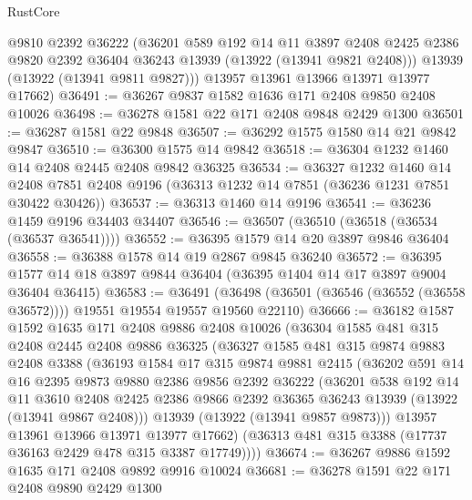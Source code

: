 \begin{lexlean}{RustCore}
\begin{coremodule}
        @9810
        @2392
        @36222
        (@36201
          @589
          @192
          @14
          @11
          @3897
          @2408
          @2425
          @2386
          @9820
          @2392
          @36404
          @36243
          @13939
          (@13922 (@13941 @9821 @2408)))
        @13939
        (@13922 (@13941 @9811 @9827)))
      @13957
      @13961
      @13966
      @13971
      @13977
      @17662)
@36491 := @36267 @9837 @1582 @1636 @171 @2408 @9850 @2408 @10026
@36498 := @36278 @1581 @22 @171 @2408 @9848 @2429 @1300
@36501 := @36287 @1581 @22 @9848
@36507 := @36292 @1575 @1580 @14 @21 @9842 @9847
@36510 := @36300 @1575 @14 @9842
@36518 := @36304 @1232 @1460 @14 @2408 @2445 @2408 @9842 @36325
@36534 := @36327
    @1232
    @1460
    @14
    @2408
    @7851
    @2408
    @9196
    (@36313 @1232 @14 @7851 (@36236 @1231 @7851 @30422 @30426))
@36537 := @36313 @1460 @14 @9196
@36541 := @36236 @1459 @9196 @34403 @34407
@36546 := @36507 (@36510 (@36518 (@36534 (@36537 @36541))))
@36552 := @36395 @1579 @14 @20 @3897 @9846 @36404
@36558 := @36388 @1578 @14 @19 @2867 @9845 @36240
@36572 := @36395 @1577 @14 @18 @3897 @9844 @36404 (@36395 @1404 @14 @17 @3897 @9004 @36404 @36415)
@36583 := @36491
    (@36498 (@36501 (@36546 (@36552 (@36558 @36572)))) @19551 @19554 @19557 @19560 @22110)
@36666 := @36182
    @1587
    @1592
    @1635
    @171
    @2408
    @9886
    @2408
    @10026
    (@36304
      @1585
      @481
      @315
      @2408
      @2445
      @2408
      @9886
      @36325
      (@36327
        @1585
        @481
        @315
        @9874
        @9883
        @2408
        @3388
        (@36193
          @1584
          @17
          @315
          @9874
          @9881
          @2415
          (@36202
            @591
            @14
            @16
            @2395
            @9873
            @9880
            @2386
            @9856
            @2392
            @36222
            (@36201
              @538
              @192
              @14
              @11
              @3610
              @2408
              @2425
              @2386
              @9866
              @2392
              @36365
              @36243
              @13939
              (@13922 (@13941 @9867 @2408)))
            @13939
            (@13922 (@13941 @9857 @9873)))
          @13957
          @13961
          @13966
          @13971
          @13977
          @17662)
        (@36313 @481 @315 @3388 (@17737 @36163 @2429 @478 @315 @3387 @17749))))
@36674 := @36267 @9886 @1592 @1635 @171 @2408 @9892 @9916 @10024
@36681 := @36278 @1591 @22 @171 @2408 @9890 @2429 @1300

\end{coremodule}
\end{lexlean}
